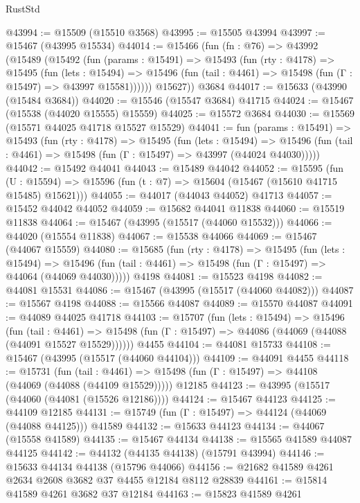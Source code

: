 \begin{lexlean}{RustStd}
\begin{coremodule}
@43994 := @15509 (@15510 @3568)
@43995 := @15505 @43994
@43997 := @15467 (@43995 @15534)
@44014 := @15466
    (fun (fn : @76) =>
    @43992
      (@15489
        (@15492
          (fun (params : @15491) =>
          @15493
            (fun (rty : @4178) =>
            @15495
              (fun (lets : @15494) =>
              @15496 (fun (tail : @4461) => @15498 (fun (Γ : @15497) => @43997 @15581))))))
        @15627))
    @3684
@44017 := @15633 (@43990 (@15484 @3684))
@44020 := @15546 (@15547 @3684) @41715
@44024 := @15467 (@15538 (@44020 @15555) @15559)
@44025 := @15572 @3684
@44030 := @15569 (@15571 @44025 @41718 @15527 @15529)
@44041 := fun (params : @15491) =>
  @15493
    (fun (rty : @4178) =>
    @15495
      (fun (lets : @15494) =>
      @15496 (fun (tail : @4461) => @15498 (fun (Γ : @15497) => @43997 (@44024 @44030)))))
@44042 := @15492 @44041
@44043 := @15489 @44042
@44052 := @15595
    (fun (U : @15594) => @15596 (fun (t : @7) => @15604 (@15467 (@15610 @41715 @15485) @15621)))
@44055 := @44017 (@44043 @44052) @41713
@44057 := @15452 @44042 @44052
@44059 := @15682 @44041 @11838
@44060 := @15519 @11838
@44064 := @15467 (@43995 (@15517 (@44060 @15532)))
@44066 := @44020 (@15554 @11838)
@44067 := @15538 @44066
@44069 := @15467 (@44067 @15559)
@44080 := @15685
    (fun (rty : @4178) =>
    @15495
      (fun (lets : @15494) =>
      @15496 (fun (tail : @4461) => @15498 (fun (Γ : @15497) => @44064 (@44069 @44030)))))
    @4198
@44081 := @15523 @4198
@44082 := @44081 @15531
@44086 := @15467 (@43995 (@15517 (@44060 @44082)))
@44087 := @15567 @4198
@44088 := @15566 @44087
@44089 := @15570 @44087
@44091 := @44089 @44025 @41718
@44103 := @15707
    (fun (lets : @15494) =>
    @15496
      (fun (tail : @4461) =>
      @15498 (fun (Γ : @15497) => @44086 (@44069 (@44088 (@44091 @15527 @15529))))))
    @4455
@44104 := @44081 @15733
@44108 := @15467 (@43995 (@15517 (@44060 @44104)))
@44109 := @44091 @4455
@44118 := @15731
    (fun (tail : @4461) => @15498 (fun (Γ : @15497) => @44108 (@44069 (@44088 (@44109 @15529)))))
    @12185
@44123 := @43995 (@15517 (@44060 (@44081 (@15526 @12186))))
@44124 := @15467 @44123
@44125 := @44109 @12185
@44131 := @15749 (fun (Γ : @15497) => @44124 (@44069 (@44088 @44125))) @41589
@44132 := @15633 @44123
@44134 := @44067 (@15558 @41589)
@44135 := @15467 @44134
@44138 := @15565 @41589 @44087 @44125
@44142 := @44132 (@44135 @44138) (@15791 @43994)
@44146 := @15633 @44134 @44138 (@15796 @44066)
@44156 := @21682 @41589 @4261 @2634 @2608 @3682 @37 @4455 @12184 @8112 @28839
@44161 := @15814 @41589 @4261 @3682 @37 @12184
@44163 := @15823 @41589 @4261

\end{coremodule}
\end{lexlean}
